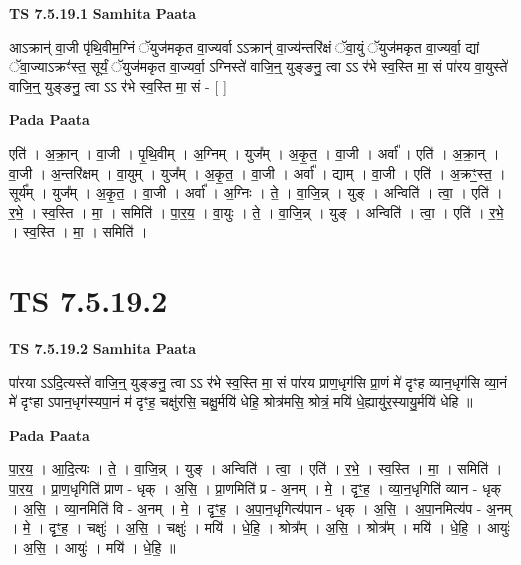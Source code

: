 \documentclass[17pt]{extarticle}
\begin{document}
\textbf{TS 7.5.19.1 } \newline
\textbf{Samhita Paata} \newline

आऽक्रान्॑ वा॒जी पृ॑थि॒वीम॒ग्निं ॅयुज॑मकृत वा॒ज्यर्वा ऽऽक्रान्॑ वा॒ज्य॑न्तरि॑क्षं ॅवा॒युं ॅयुज॑मकृत वा॒ज्यर्वा॒ द्यां ॅवा॒ज्याऽक्रꣳ॑स्त॒ सूर्यं॒ ॅयुज॑मकृत वा॒ज्यर्वा॒ ऽग्निस्ते॑ वाजि॒न्॒ युङ्ङनु॒ त्वा ऽऽ र॑भे स्व॒स्ति मा॒ सं पा॑रय वा॒युस्ते॑ वाजि॒न्॒ युङ्ङनु॒ त्वा ऽऽ र॑भे स्व॒स्ति मा॒ सं - [  ] \newline

\textbf{Pada Paata} \newline

एति॑ । अ॒क्रा॒न् । वा॒जी । पृ॒थि॒वीम् । अ॒ग्निम् । युज᳚म् । अ॒कृ॒त॒ । वा॒जी । अर्वा᳚ । एति॑ । अ॒क्रा॒न् । वा॒जी । अ॒न्तरि॑क्षम् । वा॒युम् । युज᳚म् । अ॒कृ॒त॒ । वा॒जी । अर्वा᳚ । द्याम् । वा॒जी । एति॑ । अ॒क्रꣳ॒॒स्त॒ । सूर्य᳚म् । युज᳚म् । अ॒कृ॒त॒ । वा॒जी । अर्वा᳚ । अ॒ग्निः । ते॒ । वा॒जि॒न्न् । युङ् । अन्विति॑ । त्वा॒ । एति॑ । र॒भे॒ । स्व॒स्ति । मा॒ । समिति॑ । पा॒र॒य॒ । वा॒युः । ते॒ । वा॒जि॒न्न् । युङ् । अन्विति॑ । त्वा॒ । एति॑ । र॒भे॒ । स्व॒स्ति । मा॒ । समिति॑ ।  \newline





\section{ TS 7.5.19.2 }

\textbf{TS 7.5.19.2 } \newline
\textbf{Samhita Paata} \newline

पा॑रया ऽऽदि॒त्यस्ते॑ वाजि॒न्॒ युङ्ङनु॒ त्वा ऽऽ र॑भे स्व॒स्ति मा॒ सं पा॑रय प्राण॒धृग॑सि प्रा॒णं मे॑ दृꣳह व्यान॒धृग॑सि व्या॒नं मे॑ दृꣳहा ऽपान॒धृग॑स्यपा॒नं म॑ दृꣳह॒ चक्षु॑रसि॒ चक्षु॒र्मयि॑ धेहि॒ श्रोत्र॑मसि॒ श्रोत्रं॒ मयि॑ धे॒ह्यायु॑र॒स्यायु॒र्मयि॑ धेहि ॥ \newline

\textbf{Pada Paata} \newline

पा॒र॒य॒ । आ॒दि॒त्यः । ते॒ । वा॒जि॒न्न् । युङ् । अन्विति॑ । त्वा॒ । एति॑ । र॒भे॒ । स्व॒स्ति । मा॒ । समिति॑ । पा॒र॒य॒ । प्रा॒ण॒धृगिति॑ प्राण - धृक् । अ॒सि॒ । प्रा॒णमिति॑ प्र - अ॒नम् । मे॒ । दृꣳ॒॒ह॒ । व्या॒न॒धृगिति॑ व्यान - धृक् । अ॒सि॒ । व्या॒नमिति॑ वि - अ॒नम् । मे॒ । दृꣳ॒॒ह॒ । अ॒पा॒न॒धृगित्य॑पान - धृक् । अ॒सि॒ । अ॒पा॒नमित्य॑प - अ॒नम् । मे॒ । दृꣳ॒॒ह॒ । चक्षुः॑ । अ॒सि॒ । चक्षुः॑ । मयि॑ । धे॒हि॒ । श्रोत्र᳚म् । अ॒सि॒ । श्रोत्र᳚म् । मयि॑ । धे॒हि॒ । आयुः॑ । अ॒सि॒ । आयुः॑ । मयि॑ । धे॒हि॒ ॥  \newline
\end{document}
